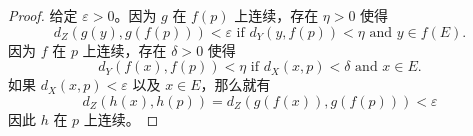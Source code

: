 \documentclass[../poma-notes.tex]{subfiles}
\begin{document}
\begin{proof}
  给定 $\varepsilon > 0$。因为 $g$ 在 $f(p)$ 上连续，存在 $\eta > 0$ 使得
  \[
    d_Z(g(y),g(f(p))) < \varepsilon \text{ if } d_Y(y,f(p)) < \eta \text{ and } y \in f(E).
  \]
  因为 $f$ 在 $p$ 上连续，存在 $\delta > 0$ 使得
  \[
    d_Y(f(x),f(p)) < \eta \text{ if } d_X(x,p) < \delta \text{ and } x \in E.
  \]
  如果 $d_X(x,p) < \varepsilon$ 以及 $x \in E$，那么就有
  \[
    d_Z(h(x),h(p)) = d_Z(g(f(x)), g(f(p))) < \varepsilon
  \]
  因此 $h$ 在 $p$ 上连续。
\end{proof}
\end{document}
